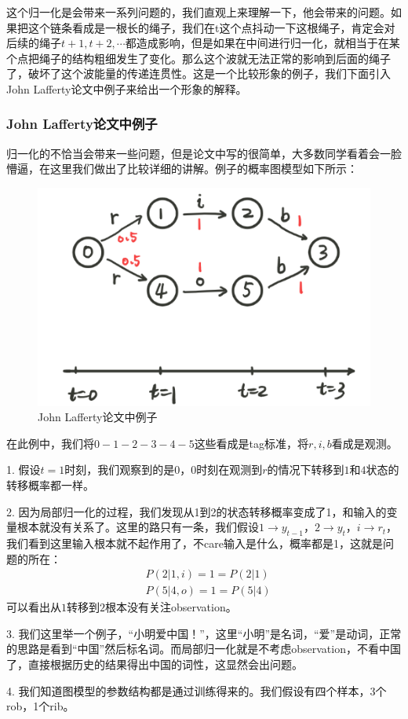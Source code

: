 \documentclass[a4paper]{article}
\begin{document}
这个归一化是会带来一系列问题的，我们直观上来理解一下，他会带来的问题。如果把这个链条看成是一根长的绳子，我们在t这个点抖动一下这根绳子，肯定会对后续的绳子$t+1,t+2,\cdots$都造成影响，但是如果在中间进行归一化，就相当于在某个点把绳子的结构粗细发生了变化。那么这个波就无法正常的影响到后面的绳子了，破坏了这个波能量的传递连贯性。这是一个比较形象的例子，我们下面引入John Lafferty论文中例子来给出一个形象的解释。

\subsubsection{John Lafferty论文中例子}
归一化的不恰当会带来一些问题，但是论文中写的很简单，大多数同学看着会一脸懵逼，在这里我们做出了比较详细的讲解。例子的概率图模型如下所示：
\begin{figure}[H]
    \centering
    \includegraphics[width=.35\textwidth]{微信图片_20200222210750.png}
    \caption{John Lafferty论文中例子}
    \label{fig:my_label_1}
\end{figure}
在此例中，我们将$0-1-2-3-4-5$这些看成是tag标准，将$r,i,b$看成是观测。

1. 假设$t=1$时刻，我们观察到的是0，$0$时刻在观测到$r$的情况下转移到$1$和$4$状态的转移概率都一样。

2. 因为局部归一化的过程，我们发现从1到2的状态转移概率变成了1，和输入的变量根本就没有关系了。这里的路只有一条，我们假设$1\rightarrow y_{t-1}$，$2\rightarrow y_{t}$，$i\rightarrow r_t$，我们看到这里输入根本就不起作用了，不care输入是什么，概率都是1，这就是问题的所在：
\begin{equation*}
    \begin{split}
        & P(2|1,i)=1=P(2|1) \\
        & P(5|4,o)=1=P(5|4)
    \end{split}
\end{equation*}
可以看出从$1$转移到$2$根本没有关注observation。

3. 我们这里举一个例子，“小明爱中国！”，这里“小明”是名词，“爱”是动词，正常的思路是看到“中国”然后标名词。而局部归一化就是不考虑observation，不看中国了，直接根据历史的结果得出中国的词性，这显然会出问题。

4. 我们知道图模型的参数结构都是通过训练得来的。我们假设有四个样本，3个rob，1个rib。
\end{document}
